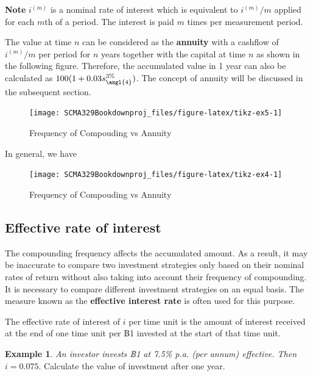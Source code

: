 \documentclass[
]{book}
\theoremstyle{definition}
\theoremstyle{definition}
\newtheorem{example}{Example}[chapter]
\theoremstyle{definition}
\theoremstyle{definition}
\theoremstyle{remark}
\begin{document}
\textbf{Note} \(i^{(m)}\) is a nominal rate of interest which is equivalent to \(i^{(m)}/m\) applied for
each \(m\)th of a period. The interest is paid \(m\) times per measurement period.

The value at time \(n\) can be considered as the \textbf{annuity} with a cashflow of \(i^{(m)}/m\) per period for \(n\) years together with the capital at time \(n\) as shown in the following figure.
Therefore, the accumulated value in 1 year can also be calculated as \(100( 1 + 0.03 s_{\angl{4}}^{3\%})\). The concept of annuity will be discussed in the subsequent section.

\begin{figure}

{\centering \texttt{[image: SCMA329Bookdownproj\_files/figure-latex/tikz-ex5-1]} 

}

\caption{Frequency of Compouding vs Annuity}\label{fig:tikz-ex5}
\end{figure}

In general, we have

\begin{figure}

{\centering \texttt{[image: SCMA329Bookdownproj\_files/figure-latex/tikz-ex4-1]} 

}

\caption{Frequency of Compouding vs Annuity}\label{fig:tikz-ex4}
\end{figure}

\hypertarget{effective-rate-of-interest}{%
\subsection{Effective rate of interest}\label{effective-rate-of-interest}}

The compounding frequency affects the accumulated amount. As a result, it may be inaccurate to compare two investment strategies only based on their nominal rates of return without also taking into account their frequency of compounding. It is necessary to compare different investment strategies on an equal basis. The measure known as the \textbf{effective interest rate} is often used for this purpose.

The effective rate of interest of \(i\) per time unit is the amount of
interest received at the end of one time unit per ฿1 invested at the
start of that time unit.

\begin{example}
\emph{An investor invests ฿1 at 7.5\% p.a. (per annum) effective. Then}
\(i = 0.075\). Calculate the value of investment after one year.
\end{example}
\end{document}
